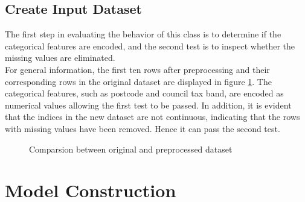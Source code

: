 \documentclass[12pt,twoside]{report}
\begin{document}
\subsection{Create Input Dataset}
The first step in evaluating the behavior of this class is to determine if the categorical features are encoded, and the second test is to inspect whether the missing values are eliminated.
\\

For general information, the first ten rows after preprocessing and their corresponding rows in the original dataset are displayed in figure \ref{general_info}. The categorical features, such as postcode and council tax band, are encoded as numerical values allowing the first test to be passed. In addition, it is evident that the indices in the new dataset are not continuous, indicating that the rows with missing values have been removed. Hence it can pass the second test. 

\begin{figure}[h]
	\centering
	\caption{Comparsion between original and preprocessed dataset}
	\label{general_info}
\end{figure}

\section{Model Construction}
\end{document}
